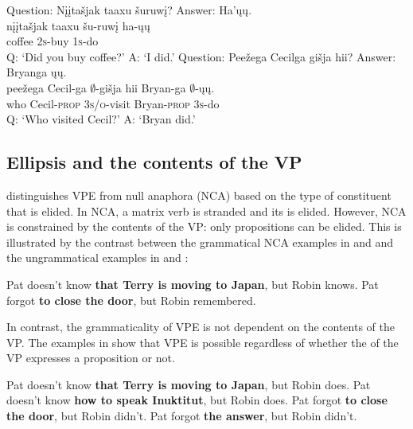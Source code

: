 \documentclass[output=paper]{LSP/langsci}
\begin{document}
 
\ea\label{ex:johnson:28}
\ea\label{ex:johnson:28a} 
\glll Question: {Nįįtašjak taaxu} šuruwį? Answer: Ha'ųų.\\
{} {nįįtašjak taaxu} šu-ruwį {} ha-ųų\\
{} coffee \textsc{2s}-buy {} \textsc{1s}-do\\
 \trans Q: `Did you buy coffee?' A: `I did.' 
\ex\label{ex:johnson:28b} 
\glll Question: Peežega Cecilga {gišja hii}? Answer: Bryanga ųų.\\
{} peežega Cecil-ga $\emptyset$-{gišja hii} {} Bryan-ga $\emptyset$-ųų.\\
{} who Cecil-\textsc{prop} \textsc{3s/o}-visit {} Bryan-\textsc{prop} \textsc{3s}-do\\
\trans Q: `Who visited Cecil?' A: `Bryan did.'
\z
\z


\subsection{Ellipsis and the contents of the VP}\label{sec:johnson:3.2}

\citet{Goldberg2005} distinguishes VPE from null  anaphora (NCA) based on the type of constituent that is elided. In NCA, a matrix verb is stranded and its  is elided. However, NCA is constrained by the contents of the VP: only propositions can be elided. This is illustrated by the contrast between the grammatical NCA examples in  and  and the ungrammatical examples in  and :
 
\ea\label{ex:johnson:29}
\ea\label{ex:johnson:29a} 
Pat doesn't know \textbf{that Terry is moving to Japan}, but Robin knows.
\label{ex:johnson:29b}
\ex\label{ex:johnson:29c}
Pat forgot \textbf{to close the door}, but Robin remembered.
\label{ex:johnson:29d}
\z
\z

In contrast, the grammaticality of VPE is not dependent on the contents of the VP. The examples in  show that VPE is possible regardless of whether the  of the VP expresses a proposition or not.
 
\ea\label{ex:johnson:30}
\ea 
Pat doesn't know \textbf{that Terry is moving to Japan}, but Robin does.
\ex 
Pat doesn't know \textbf{how to speak Inuktitut}, but Robin does.
\ex 
Pat forgot \textbf{to close the door}, but Robin didn't.
\ex 
Pat forgot \textbf{the answer}, but Robin didn't.
\z
\z
\end{document}

